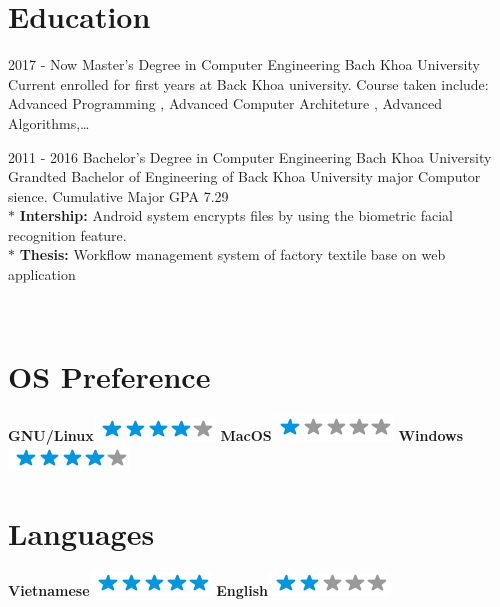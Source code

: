 \documentclass[]{friggeri-cv}
\begin{document}
\section{Education}
\begin{entrylist}
  \entry
    {2017 - Now}
    {Master's Degree in Computer Engineering}
    {Bach Khoa University}
    {Current enrolled for first years at Back Khoa university. Course taken include: 
Advanced Programming , Advanced Computer Architeture , Advanced Algorithms,…\\}
\end{entrylist}
\begin{entrylist}
  \entry
    {2011 - 2016}
    {Bachelor's Degree in Computer Engineering}
    {Bach Khoa University}
    {Grandted Bachelor of Engineering of Back Khoa University major Computor sience. Cumulative Major GPA 7.29\\
       $*$ \textbf{Intership:} Android system encrypts files by using the biometric facial recognition feature.\\
       $*$ \textbf{Thesis:} 	Workflow management system of factory textile base on web application\\}
\end{entrylist}


\begin{aside}
~
~
~
  \section{OS Preference}
    \textbf{GNU/Linux}\includegraphics[scale=0.40]{img/4stars.png}
    \textbf{MacOS}\includegraphics[scale=0.40]{img/1stars.png}
    \textbf{Windows}\includegraphics[scale=0.40]{img/4stars.png}
  \section{Languages}
    \textbf{Vietnamese}\includegraphics[scale=0.40]{img/5stars.png}
    \textbf{English}\includegraphics[scale=0.40]{img/2stars.png}
    ~
\end{aside}
\end{document}
